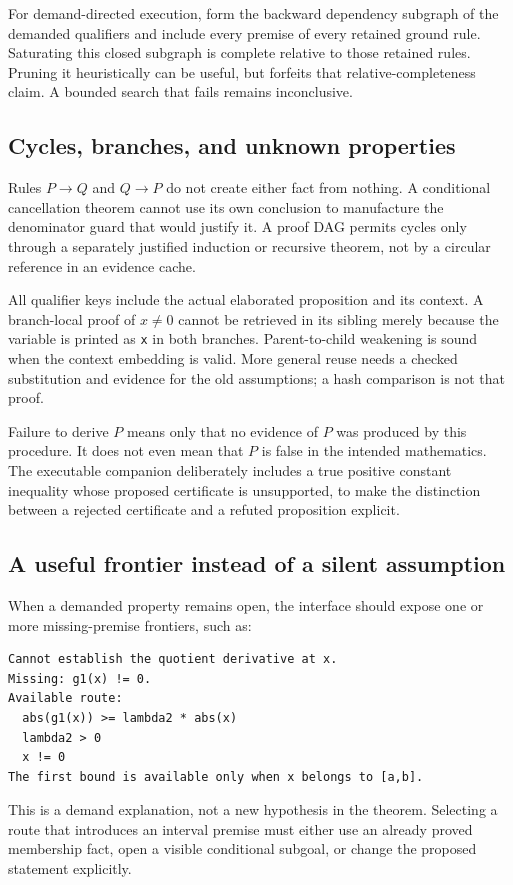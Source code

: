 \documentclass[11pt,a4paper]{article}
\theoremstyle{definition}
\theoremstyle{remark}
\newcommand{\code}[1]{\texttt{#1}}
\begin{document}
For demand-directed execution, form the backward dependency subgraph of the demanded qualifiers and include every premise of every retained ground rule. Saturating this closed subgraph is complete relative to those retained rules. Pruning it heuristically can be useful, but forfeits that relative-completeness claim. A bounded search that fails remains inconclusive.

\subsection{Cycles, branches, and unknown properties}
Rules $P\to Q$ and $Q\to P$ do not create either fact from nothing. A conditional cancellation theorem cannot use its own conclusion to manufacture the denominator guard that would justify it. A proof DAG permits cycles only through a separately justified induction or recursive theorem, not by a circular reference in an evidence cache.

All qualifier keys include the actual elaborated proposition and its context. A branch-local proof of $x\ne0$ cannot be retrieved in its sibling merely because the variable is printed as \code{x} in both branches. Parent-to-child weakening is sound when the context embedding is valid. More general reuse needs a checked substitution and evidence for the old assumptions; a hash comparison is not that proof.

Failure to derive $P$ means only that no evidence of $P$ was produced by this procedure. It does not even mean that $P$ is false in the intended mathematics. The executable companion deliberately includes a true positive constant inequality whose proposed certificate is unsupported, to make the distinction between a rejected certificate and a refuted proposition explicit.

\subsection{A useful frontier instead of a silent assumption}
When a demanded property remains open, the interface should expose one or more missing-premise frontiers, such as:
\begin{lstlisting}
Cannot establish the quotient derivative at x.
Missing: g1(x) != 0.
Available route:
  abs(g1(x)) >= lambda2 * abs(x)
  lambda2 > 0
  x != 0
The first bound is available only when x belongs to [a,b].
\end{lstlisting}
This is a demand explanation, not a new hypothesis in the theorem. Selecting a route that introduces an interval premise must either use an already proved membership fact, open a visible conditional subgoal, or change the proposed statement explicitly.
\end{document}
